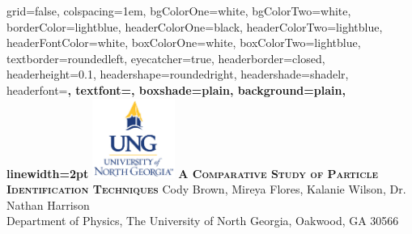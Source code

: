 \documentclass[landscape,final,a0paper,fontscale=0.285]{baposter}
\begin{document}


\begin{poster}%
  {
  grid=false,
  colspacing=1em,
  bgColorOne=white,
  bgColorTwo=white,
  borderColor=lightblue,
  headerColorOne=black,
  headerColorTwo=lightblue,
  headerFontColor=white,
  boxColorOne=white,
  boxColorTwo=lightblue,
  textborder=roundedleft,
  eyecatcher=true,
  headerborder=closed,
  headerheight=0.1\textheight,
  headershape=roundedright,
  headershade=shadelr,
  headerfont=\Large\bf\textsc, %
  textfont={\setlength{\parindent}{1.5em}},
  boxshade=plain,
  background=plain,
  linewidth=2pt
  }
  {\includegraphics[height=7em]{figures/ungLogo.jpg}} 
  {\bf\textsc{A Comparative Study of Particle Identification Techniques}\vspace{0.25em}}
  {
    Cody Brown, Mireya Flores, Kalanie Wilson, Dr. Nathan Harrison \\
    \vspace{2mm}
    Department of Physics, The University of North Georgia, Oakwood, GA 30566
  }



\end{poster}
\end{document}
